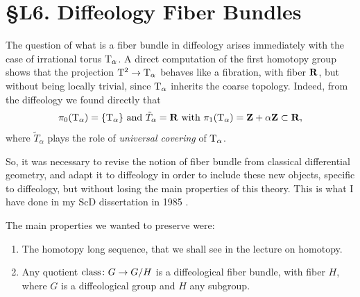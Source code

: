 
\chapter*{\S L6. Diffeology Fiber Bundles}
\setcounter{footnote}{0}

\begin{abstract}
  This lecture talks about the theory of diffeology fiber bundles,
  which deviates from the usual locally trivial bundles,
  where local triviality is replaced in diffeology by local triviality along the plots.
  We illustrate this definition with a few examples where some new situations happen only in diffeology.
\end{abstract}


The question of what is a fiber bundle in diffeology arises immediately with the case of irrational torus $\mathrm{T}_\alpha$.
A direct computation of the first homotopy group shows that the projection $\mathrm{T}^2 \to  {\mathrm{T}}_{\alpha}$ behaves like a fibration,
with fiber $\mathbf{R}$,
but without being locally trivial,
since ${\mathrm{T}}_{\alpha}$ inherits the coarse topology.
Indeed,
from the diffeology we found directly that
$$%
  \pi_0(\Torus_\alpha) = \{\Torus_\alpha\}
  \SpacedText{and}
  \tilde{T}_\alpha = \RR
  \SpacedText{with}
  \pi_1(\Torus_\alpha) = \ZZ + \alpha \ZZ \subset \RR,
$$%
where $\tilde{T}_\alpha$ plays the role of \emph{universal covering} of $\mathrm{T}_\alpha$.

So,
it was necessary to revise the notion of fiber bundle from classical differential geometry,
and adapt it to diffeology in order to include these new objects,
specific to diffeology,
but without losing the main properties of this theory.
This is what I have done in my ScD dissertation in 1985 \cite{Igl85}.

The main properties we wanted to preserve were:

\begin{enumerate}
  \item The homotopy long sequence,
  that we shall see in the lecture on homotopy.
  \item Any quotient $\operatorname{class} \colon G \to G/H$ is a diffeological fiber bundle,
  with fiber $H$,
  where $G$ is a diffeological group and $H$ any subgroup.
\end{enumerate}

